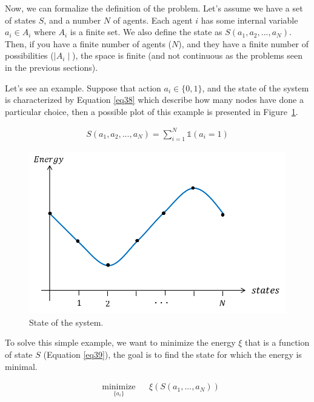 Now, we can formalize the definition of the problem. Let's assume we have a set of states $S$, and a number $N$ of agents. Each agent $i$ has some internal variable $a_i \in  A_i$ where $A_i$ is a finite set. We also define the state as $S(a_1, a_2, ... , a_N)$. Then, if you have a finite number of agents ($N$), and they have a finite number of possibilities ($\mid A_i \mid$), the space is finite (and not continuous as the problems seen in the previous sections).

Let's see an example. Suppose that action $a_i \in \{0,1\}$, and the state of the system is characterized by Equation \ref{eq38} which describe how many nodes have done a particular choice, then a possible plot of this example is presented in Figure~\ref{figur11}.

\begin{equation}
\begin{aligned}
S(a_1, a_2, ... , a_N)=\sum_{i = 1}^{N} \mathds{1}(a_i = 1)
\end{aligned}
\label{eq38}
\end{equation}

\begin{figure}[h!]
\centering
\includegraphics[scale=.5]{statesVsEnergy}
\caption{State of the system.}
\label{figur11}
\end{figure}

To solve this simple example, we want to minimize the energy $\xi$ that is a function of state $S$ (Equation \ref{eq39}), the goal is to find the state for which the energy is minimal.

\begin{equation}
\begin{aligned}
& \underset{\{a_{i}\}}{\text{minimize}}
& &  \xi(S(a_1,...,a_N))\\
\end{aligned}
\label{eq39}
\end{equation}


